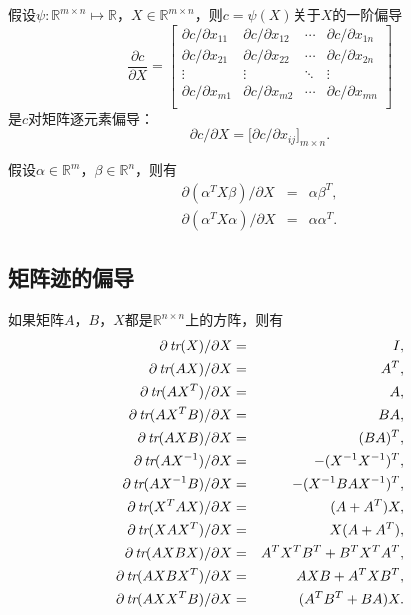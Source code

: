 \begin{definition}
假设$\psi:\mathbb R^{m\times n} \mapsto \mathbb R$，$X\in \mathbb R^{m\times n}$，则$c = \psi(X)$关于$X$的一阶偏导
\begin{equation}
    \frac{\partial c}{\partial X} =
    \begin{bmatrix}
        \partial c/\partial x_{11} & \partial c/\partial x_{12} & \cdots & \partial c/\partial x_{1n}\\
        \partial c/\partial x_{21} & \partial c/\partial x_{22} & \cdots & \partial c/\partial x_{2n}\\
        \vdots & \vdots & \ddots & \vdots\\
        \partial c/\partial x_{m1} & \partial c/\partial x_{m2} & \cdots & \partial c/\partial x_{mn}\\
    \end{bmatrix}
\end{equation}
是$c$对矩阵逐元素偏导：
\begin{equation}
    \partial c /\partial X = \Big[\partial c/\partial x_{ij}\Big]_{m\times n}.
\end{equation}
\end{definition}

\begin{proposition}
假设$\alpha \in \mathbb R^m$，$\beta \in \mathbb R^n$，则有
\begin{eqnarray}
  \partial (\alpha^T X \beta)/\partial X &=& \alpha \beta^T, \\
  \partial (\alpha^T X \alpha)/\partial X &=& \alpha \alpha^T.
\end{eqnarray}
\end{proposition}

\subsection{矩阵迹的偏导}
如果矩阵$A$，$B$，$X$都是$\mathbb R^{n\times n}$上的方阵，则有
\begin{eqnarray}
  \partial \operatorname{\textit{tr}}(X)/\partial X &=& I, \\
  \partial \operatorname{\textit{tr}}(AX)/\partial X &=& A^T, \\
  \partial \operatorname{\textit{tr}}(AX^T)/\partial X &=& A, \\
  \partial \operatorname{\textit{tr}}(AX^TB)/\partial X &=& BA, \\
  \partial \operatorname{\textit{tr}}(AXB)/\partial X &=& (BA)^T, \\
  \partial \operatorname{\textit{tr}}(AX^{-1})/\partial X &=& -(X^{-1}X^{-1})^T, \\
  \partial \operatorname{\textit{tr}}(AX^{-1}B)/\partial X &=& -(X^{-1}BAX^{-1})^T, \\
  \partial \operatorname{\textit{tr}}(X^TAX)/\partial X &=& (A+A^T)X, \\
  \partial \operatorname{\textit{tr}}(XAX^T)/\partial X &=& X(A+A^T), \\
  \partial \operatorname{\textit{tr}}(AXBX)/\partial X &=& A^TX^TB^T + B^TX^TA^T, \\
  \partial \operatorname{\textit{tr}}(AXBX^T)/\partial X &=& AXB + A^T XB^T, \\
  \partial \operatorname{\textit{tr}}(AXX^TB)/\partial X &=& (A^TB^T + BA)X.
\end{eqnarray}
